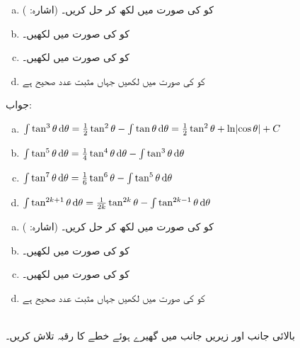 \begin{enumerate}[a.]
\item
{} کو  کی صورت میں لکھ کر حل کریں۔ (اشارہ: )
\item
{} کو  کی صورت میں لکھیں۔
\item
{} کو  کی صورت میں لکھیں۔
\item
{} کو  کی صورت میں لکھیں جہاں  مثبت عدد صحیح ہے
\end{enumerate}
جواب:\quad
\begin{enumerate}[a.]
\item
$\int\tan^3\theta\dif\theta=\tfrac{1}{2}\tan^2\theta-\int\tan\theta\dif\theta=\tfrac{1}{2}\tan^2\theta+\ln\abs{\cos \theta}+C$
\item
$\int\tan^5\theta\dif\theta=\tfrac{1}{4}\tan^4\theta\dif\theta-\int\tan^3\theta\dif\theta$
\item
$\int\tan^7\theta\dif\theta=\tfrac{1}{6}\tan^6\theta-\int\tan^5\theta\dif\theta$
\item
$\int\tan^{2k+1}\theta\dif\theta=\tfrac{1}{2k}\tan^{2k}\theta-\int\tan^{2k-1}\theta\dif\theta$
\end{enumerate}
\begin{enumerate}[a.]
\item
{} کو  کی صورت میں لکھ کر حل کریں۔ (اشارہ: )
\item
{} کو  کی صورت میں لکھیں۔
\item
{} کو  کی صورت میں لکھیں۔
\item
{} کو  کی صورت میں لکھیں جہاں  مثبت عدد صحیح ہے
\end{enumerate}
\\
بالائی جانب  اور زیریں جانب  میں گھیرے ہوئے خطے کا رقبہ تلاش کریں۔\\
